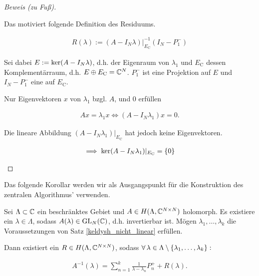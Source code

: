 \begin{proof}[Beweis (zu Fuß)]
\begin{enumerate}[label = (\roman*)]
        Das motiviert folgende Definition des Residuums.

        \begin{align*}
            R(\lambda)
            :=
            (A - I_N \lambda) |_{E_\mathrm{C}}^{-1} (I_N - P_1^-)
        \end{align*}

        Sei dabei $E := \operatorname{ker}(A - I_N \lambda)$, d.h. der Eigenraum von $\lambda_1$ und $E_\mathrm{C}$ dessen Komplementärraum, d.h. $E \oplus E_\mathrm{C} = \mathbb{C}^N$.
        $P_1^-$ ist eine Projektion auf $E$ und $I_N - P_1^-$ eine auf $E_\mathrm{C}$.

        Nur Eigenvektoren $x$ von $\lambda_1$ bzgl. $A$, und $0$ erfüllen

        \begin{align*}
            A x = \lambda_1 x
            \iff
            (A - I_N \lambda_1) x = 0.
        \end{align*}

        Die lineare Abbildung $(A - I_N \lambda_1) |_{E_\mathrm{C}}$ hat jedoch keine Eigenvektoren.

        \begin{align*}
            \implies
            \operatorname{ker}(A - I_N \lambda_1) |_{E_\mathrm{C}} = {\left \{ 0 \right \}}
        \end{align*}



    \end{enumerate}

\end{proof}

Das folgende Korollar werden wir als Ausgangspunkt für die Konstruktion des zentralen Algorithmus' verwenden.

\begin{corollary}

    Sei $\Lambda \subset \mathbb{C}$ ein beschränktes Gebiet und $A \in H(\Lambda, \mathbb{C}^{N \times N})$ holomorph.
    Es existiere ein $\lambda \in \Lambda$, sodass $A(\lambda) \in \operatorname{GL}_N(\mathbb{C})$, d.h. invertierbar ist.
    Mögen $\lambda_1, \dots, \lambda_k$ die Voraussetzungen von Satz \ref{keldysh_nicht_linear} erfüllen.

    Dann existiert ein $R \in H(\Lambda, \mathbb{C}^{N \times N})$, sodass $\forall \, \lambda \in \Lambda \setminus {\left \{ \lambda_1, \dots, \lambda_k \right \}}:$

    \begin{align*}
        A^{-1}(\lambda)
        =
        \sum_{n=1}^k
            \frac{1}{\lambda - \lambda_n} P_n^+
        +
        R(\lambda).
    \end{align*}

\end{corollary}

